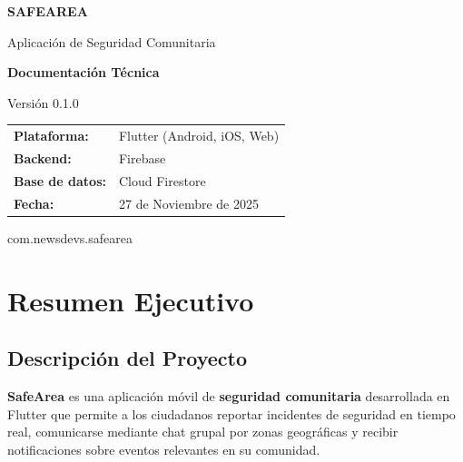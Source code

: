 \documentclass[12pt,a4paper]{article}
\begin{document}
\begin{titlepage}
    \centering
    \vspace*{2cm}
    
    {\Huge\bfseries SAFEAREA\par}
    \vspace{0.5cm}
    {\Large Aplicación de Seguridad Comunitaria\par}
    \vspace{2cm}
    
    {\LARGE\bfseries Documentación Técnica\par}
    \vspace{1cm}
    
    {\large Versión 0.1.0\par}
    \vspace{2cm}
    
    \begin{tabular}{ll}
        \textbf{Plataforma:} & Flutter (Android, iOS, Web) \\
        \textbf{Backend:} & Firebase \\
        \textbf{Base de datos:} & Cloud Firestore \\
        \textbf{Fecha:} & 27 de Noviembre de 2025 \\
    \end{tabular}
    
    \vfill
    
    {\large com.newsdevs.safearea\par}
\end{titlepage}

\tableofcontents
\newpage


\section{Resumen Ejecutivo}

\subsection{Descripción del Proyecto}

\textbf{SafeArea} es una aplicación móvil de \textbf{seguridad comunitaria} desarrollada en Flutter que permite a los ciudadanos reportar incidentes de seguridad en tiempo real, comunicarse mediante chat grupal por zonas geográficas y recibir notificaciones sobre eventos relevantes en su comunidad.
\end{document}
